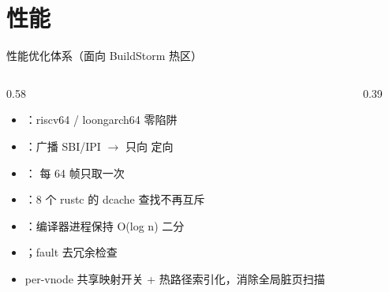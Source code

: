 \documentclass[aspectratio=1610]{beamer}
\begin{document}
\section{性能}

\begin{frame}{性能优化体系（面向 BuildStorm 热区）}
    \begin{columns}[t]
        \begin{column}{0.58\textwidth}
            \footnotesize
            \begin{itemize}
                \item {}：riscv64 / loongarch64  零陷阱
                \item {}：广播 SBI/IPI $\rightarrow$ 只向  定向
                \item {}： 每 64 帧只取一次 
                \item {}：8 个 rustc 的 dcache 查找不再互斥
                \item {}：编译器进程保持 O(log n) 二分
                \item {}；fault 去冗余检查
                \item per-vnode 共享映射开关 + 热路径索引化，消除全局脏页扫描
            \end{itemize}
        \end{column}
        \begin{column}{0.39\textwidth}
            \vspace{0.3em}
        \end{column}
    \end{columns}
\end{frame}
\end{document}
